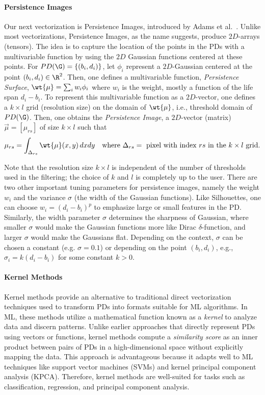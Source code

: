 \paragraph*{Persistence Images} Our next vectorization is Persistence Images, introduced by Adams et al.~\cite{adams2017persistence}. Unlike most vectorizations, Persistence Images, as the name suggests, produce $2D$-arrays (tensors). The idea is to capture the location of the points in the PDs with a multivariable function by using the $2D$ Gaussian functions centered at these points. For $PD(\G)=\{(b_i,d_i)\}$, let $\phi_i$ represent a $2D$-Gaussian centered at the point $(b_i,d_i)\in \R^2$. Then, one defines a multivariable function, \textit{Persistence Surface}, $\wt{\mu}=\sum_iw_i\phi_i$ where $w_i$ is the weight, mostly a function of the life span $d_i-b_i$. To represent this multivariable function as a $2D$-vector, one defines a $k\times l$ grid (resolution size) on the domain of $\wt{\mu}$, i.e., threshold domain of $PD(\G)$. Then, one obtains the \textit{Persistence Image}, a $2D$-vector (matrix) $\vec{\mu}=[\mu_{rs}]$  of size $k\times l$ such that 
$$\mu_{rs}=\int_{\Delta_{rs}}\wt{\mu}(x,y)\,dxdy \quad \text{where } \Delta_{rs}= \text{ pixel with index }rs \text{ in the } k\times l \text{ grid.}$$


Note that the resolution size $k\times l$ is independent of the number of thresholds used in the filtering; the choice of $k$ and $l$ is completely up to the user. There are two other important tuning parameters for persistence images, namely the weight $w_i$ and the variance $\sigma$ (the width of the Gaussian functions). Like Silhouettes, one can choose $w_i=(d_i-b_i)^p$ to emphasize large or small features in the PD. Similarly, the width parameter $\sigma$ determines the sharpness of Gaussian, where smaller $\sigma$ would make the Gaussian functions more like Dirac $\delta$-function, and larger $\sigma$ would make the Gaussians flat. Depending on the context, $\sigma$ can be chosen a constant (e.g. $\sigma=0.1$) or depending on the point $(b_i,d_i)$, e.g., $\sigma_i=k(d_i-b_i)$ for some constant $k>0$.



\paragraph*{Kernel Methods} \label{sec:kernel} Kernel methods provide an alternative to traditional direct vectorization techniques used to transform PDs into formats suitable for ML algorithms. In ML, these methods utilize a mathematical function known as a \textit{kernel} to analyze data and discern patterns. Unlike earlier approaches that directly represent PDs using vectors or functions, kernel methods compute a \textit{similarity score} as an inner product between pairs of PDs in a high-dimensional space without explicitly mapping the data. This approach is advantageous because it adapts well to ML techniques like support vector machines (SVMs) and kernel principal component analysis (KPCA). Therefore, kernel methods are well-suited for tasks such as classification, regression, and principal component analysis.

